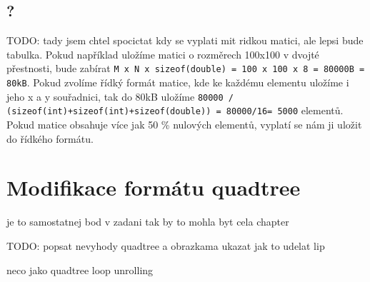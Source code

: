 \section{?}

TODO: tady jsem chtel spocictat kdy  se vyplati mit ridkou matici, ale lepsi bude tabulka. Pokud například uložíme matici o rozměrech 100x100 v dvojté přestnosti, bude zabírat \texttt{M x N x sizeof(double) = 100 x 100 x 8 = 80000B = 80kB}. Pokud zvolíme řídký formát matice, kde ke každému elementu uložíme i jeho x a y souřadnici, tak do 80kB uložíme \texttt{80000 / (sizeof(int)+sizeof(int)+sizeof(double)) = 80000/16= 5000} elementů. Pokud matice obsahuje více jak 50  \% nulových elementů, vyplatí se nám ji uložit do řídkého formátu.


\chapter{Modifikace formátu quadtree}

je to samostatnej bod v zadani tak by to mohla byt cela chapter

TODO: popsat nevyhody quadtree a obrazkama ukazat jak to udelat lip

neco jako quadtree loop unrolling
